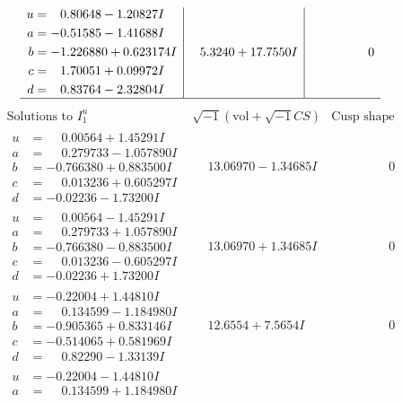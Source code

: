 \documentclass[1p]{elsarticle_modified}
\theoremstyle{definition}
\newcommand{\I}{\sqrt{-1}}
\begin{document}
$$\begin{array}{c|c|c}
\begin{aligned}
u &= \phantom{-}0.80648 - 1.20827 I \\
a &= -0.51585 - 1.41688 I \\
b &= -1.226880 + 0.623174 I \\
c &= \phantom{-}1.70051 + 0.09972 I \\
d &= \phantom{-}0.83764 - 2.32804 I\end{aligned}
 & \phantom{-}5.3240 + 17.7550 I & \phantom{-0.000000 } 0\\
 \hline 
 \end{array}$$\newpage$$\begin{array}{c|c|c}  
\text{Solutions to }I^u_{1}& \I (\text{vol} + \sqrt{-1}CS) & \text{Cusp shape}\\
 \hline 
\begin{aligned}
u &= \phantom{-}0.00564 + 1.45291 I \\
a &= \phantom{-}0.279733 - 1.057890 I \\
b &= -0.766380 + 0.883500 I \\
c &= \phantom{-}0.013236 + 0.605297 I \\
d &= -0.02236 - 1.73200 I\end{aligned}
 & \phantom{-}13.06970 - 1.34685 I & \phantom{-0.000000 } 0 \\ \hline\begin{aligned}
u &= \phantom{-}0.00564 - 1.45291 I \\
a &= \phantom{-}0.279733 + 1.057890 I \\
b &= -0.766380 - 0.883500 I \\
c &= \phantom{-}0.013236 - 0.605297 I \\
d &= -0.02236 + 1.73200 I\end{aligned}
 & \phantom{-}13.06970 + 1.34685 I & \phantom{-0.000000 } 0 \\ \hline\begin{aligned}
u &= -0.22004 + 1.44810 I \\
a &= \phantom{-}0.134599 - 1.184980 I \\
b &= -0.905365 + 0.833146 I \\
c &= -0.514065 + 0.581969 I \\
d &= \phantom{-}0.82290 - 1.33139 I\end{aligned}
 & \phantom{-}12.6554 + 7.5654 I & \phantom{-0.000000 } 0 \\ \hline\begin{aligned}
u &= -0.22004 - 1.44810 I \\
a &= \phantom{-}0.134599 + 1.184980 I \\

\end{aligned}
\end{array}$$
\end{document}
